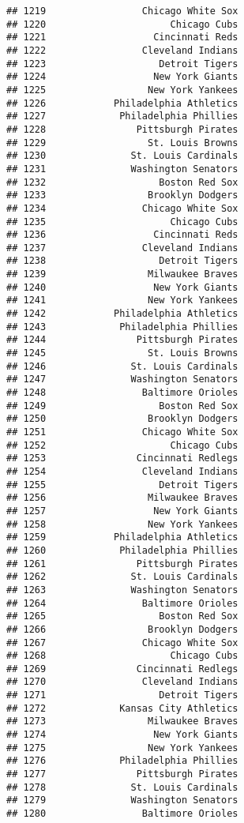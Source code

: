 \documentclass[]{article}
\begin{document}
\begin{verbatim}
## 1219                 Chicago White Sox
## 1220                      Chicago Cubs
## 1221                   Cincinnati Reds
## 1222                 Cleveland Indians
## 1223                    Detroit Tigers
## 1224                   New York Giants
## 1225                  New York Yankees
## 1226            Philadelphia Athletics
## 1227             Philadelphia Phillies
## 1228                Pittsburgh Pirates
## 1229                  St. Louis Browns
## 1230               St. Louis Cardinals
## 1231               Washington Senators
## 1232                    Boston Red Sox
## 1233                  Brooklyn Dodgers
## 1234                 Chicago White Sox
## 1235                      Chicago Cubs
## 1236                   Cincinnati Reds
## 1237                 Cleveland Indians
## 1238                    Detroit Tigers
## 1239                  Milwaukee Braves
## 1240                   New York Giants
## 1241                  New York Yankees
## 1242            Philadelphia Athletics
## 1243             Philadelphia Phillies
## 1244                Pittsburgh Pirates
## 1245                  St. Louis Browns
## 1246               St. Louis Cardinals
## 1247               Washington Senators
## 1248                 Baltimore Orioles
## 1249                    Boston Red Sox
## 1250                  Brooklyn Dodgers
## 1251                 Chicago White Sox
## 1252                      Chicago Cubs
## 1253                Cincinnati Redlegs
## 1254                 Cleveland Indians
## 1255                    Detroit Tigers
## 1256                  Milwaukee Braves
## 1257                   New York Giants
## 1258                  New York Yankees
## 1259            Philadelphia Athletics
## 1260             Philadelphia Phillies
## 1261                Pittsburgh Pirates
## 1262               St. Louis Cardinals
## 1263               Washington Senators
## 1264                 Baltimore Orioles
## 1265                    Boston Red Sox
## 1266                  Brooklyn Dodgers
## 1267                 Chicago White Sox
## 1268                      Chicago Cubs
## 1269                Cincinnati Redlegs
## 1270                 Cleveland Indians
## 1271                    Detroit Tigers
## 1272             Kansas City Athletics
## 1273                  Milwaukee Braves
## 1274                   New York Giants
## 1275                  New York Yankees
## 1276             Philadelphia Phillies
## 1277                Pittsburgh Pirates
## 1278               St. Louis Cardinals
## 1279               Washington Senators
## 1280                 Baltimore Orioles

\end{verbatim}
\end{document}
